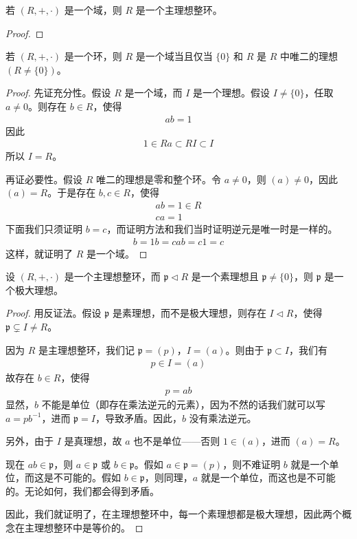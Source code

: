 \documentclass[../../main.tex]{subfiles}
\begin{document}
\begin{proposition}
若 $(R, +, \cdot)$ 是一个域，则 $R$ 是一个主理想整环。
\end{proposition}
\begin{proof}

\end{proof}

\begin{lemma}
若 $(R, +, \cdot)$ 是一个环，则 $R$ 是一个域当且仅当 $\{0\}$ 和 $R$ 是 $R$ 中唯二的理想 $(R \neq \{0\})$。
\end{lemma}
\begin{proof}
先证充分性。假设 $R$ 是一个域，而 $I$ 是一个理想。假设 $I \neq \{0\}$，任取 $a \neq 0$。则存在 $b \in R$，使得
\begin{align*}
ab = 1
\end{align*}
因此
\begin{align*}
1 \in Ra \subset RI \subset I
\end{align*}
所以 $I = R$。

再证必要性。假设 $R$ 唯二的理想是零和整个环。令 $a \neq 0$，则 $(a) \neq 0$，因此 $(a) = R$。于是存在 $b, c \in R$，使得
\begin{align*}
ab = 1 \in R\\
ca = 1
\end{align*}
下面我们只须证明 $b = c$，而证明方法和我们当时证明逆元是唯一时是一样的。
\begin{align*}
b = 1b = cab = c1 = c
\end{align*}
这样，就证明了 $R$ 是一个域。
\end{proof}

\begin{proposition}
设 $(R, +, \cdot)$ 是一个主理想整环，而 $\mathfrak{p} \lhd R$ 是一个素理想且 $\mathfrak{p} \neq \{0\}$，则 $\mathfrak{p}$ 是一个极大理想。
\end{proposition}
\begin{proof}
用反证法。假设 $\mathfrak{p}$ 是素理想，而不是极大理想，则存在 $I \lhd R$，使得 $\mathfrak{p} \subsetneq I \neq R$。

因为 $R$ 是主理想整环，我们记 $\mathfrak{p} = (p)$，$I = (a)$。则由于 $\mathfrak{p} \subset I$，我们有
\begin{align*}
p \in I = (a)
\end{align*}
故存在 $b \in R$，使得
\begin{align*}
p = ab
\end{align*}
显然，$b$ 不能是单位（即存在乘法逆元的元素），因为不然的话我们就可以写 $a = pb^{-1}$，进而 $\mathfrak{p} = I$，导致矛盾。因此，$b$ 没有乘法逆元。

另外，由于 $I$ 是真理想，故 $a$ 也不是单位——否则 $1 \in (a)$，进而 $(a) = R$。

现在 $ab \in \mathfrak{p}$，则 $a \in \mathfrak{p}$ 或 $b \in \mathfrak{p}$。假如 $a \in \mathfrak{p} = (p)$，则不难证明 $b$ 就是一个单位，而这是不可能的。假如 $b \in \mathfrak{p}$，则同理，$a$ 就是一个单位，而这也是不可能的。无论如何，我们都会得到矛盾。

因此，我们就证明了，在主理想整环中，每一个素理想都是极大理想，因此两个概念在主理想整环中是等价的。 
\end{proof}
\end{document}
